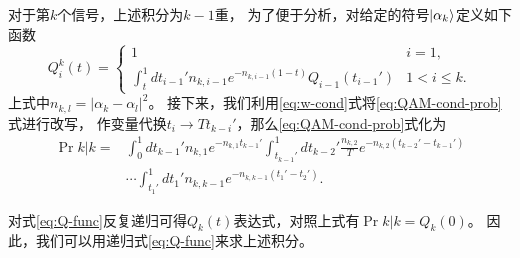 对于第$k$个信号，上述积分为$k-1$重，
为了便于分析，对给定的符号$\ket{\alpha_k}$定义如下函数
\begin{equation}
Q_i^k(t) = \begin{cases}
            1 & i=1, \\
            \int_t^1  dt_{i-1}' n_{k,i-1} e^{-n_{k,i-1}(1-t)} Q_{i-1}(t_{i-1}') & 1 < i \le k.
         \end{cases}
\label{eq:Q-func}
\end{equation}
上式中$n_{k,l} = |\alpha_k - \alpha_l|^2$。
接下来，我们利用\ref{eq:w-cond}式将\ref{eq:QAM-cond-prob}式进行改写，
作变量代换$t_i \rightarrow T t_{k-i}'$，那么\ref{eq:QAM-cond-prob}式化为
\begin{equation}
\begin{split}
\Pr{k|k} = & \int_{0}^1 dt_{k-1}' n_{k,1} e^{-n_{k,1} t_{k-1}'}          \int_{t_{k-1}'}^1 dt_{k-2}'   \frac{n_{k,2}}{T} e^{-n_{k,2} (t_{k-2}'-t_{k-1}')} \\
           & \cdots    \int_{t_1'}^1 dt_1' n_{k,k-1} e^{-n_{k,k-1} (t_1'-t_2')}.
\end{split}
\end{equation}

对式\ref{eq:Q-func}反复递归可得$Q_k(t)$表达式，对照上式有$\Pr{k|k} = Q_k(0)$。
因此，我们可以用递归式\ref{eq:Q-func}来求上述积分。

